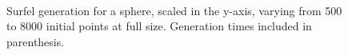 \begin{figure}[h!]
   \\
   \captionfonts
   \caption[Sphere surfels at full size]{Surfel generation for a sphere, scaled in the y-axis, varying from 500 to 8000 initial points at full size. Generation times included in parenthesis.}
   \label{fig:sphere_surfels}
\end{figure}

